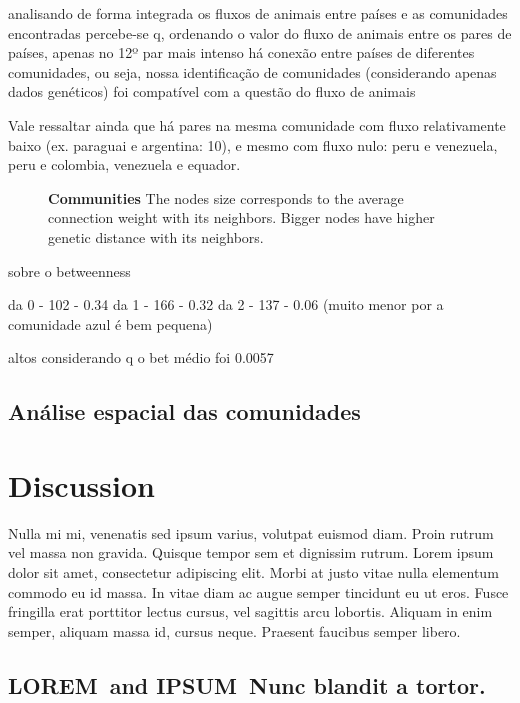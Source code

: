 \documentclass[10pt,letterpaper]{article}
\newcommand{\lorem}{{\bf LOREM}}
\newcommand{\ipsum}{{\bf IPSUM}}
\begin{document}
analisando de forma integrada os fluxos de animais entre países e as comunidades encontradas percebe-se q, ordenando o valor do fluxo de animais entre os pares de países, apenas no 12º par mais intenso há conexão entre países de diferentes comunidades, ou seja, nossa identificação de comunidades (considerando apenas dados genéticos) foi compatível com a questão do fluxo de animais

Vale ressaltar ainda que há pares na mesma comunidade com fluxo relativamente baixo (ex. paraguai e argentina: 10), e mesmo com fluxo nulo:
peru e venezuela, peru e colombia, venezuela e equador.




\begin{figure}[h]
\caption{{\bf Communities}
The nodes size corresponds to the average connection weight with its neighbors. Bigger nodes have higher genetic distance with its neighbors.}
\label{fig:communities}
\end{figure}



sobre o betweenness

da 0 - 102 - 0.34
da 1 - 166 - 0.32
da 2 - 137 - 0.06 (muito menor por a comunidade azul é bem pequena)

altos considerando q o bet médio foi 0.0057



\subsection*{Análise espacial das comunidades}

\section*{Discussion}
Nulla mi mi, venenatis sed ipsum varius, volutpat euismod diam. Proin rutrum vel massa non gravida. Quisque tempor sem et dignissim rutrum. Lorem ipsum dolor sit amet, consectetur adipiscing elit. Morbi at justo vitae nulla elementum commodo eu id massa. In vitae diam ac augue semper tincidunt eu ut eros. Fusce fringilla erat porttitor lectus cursus, vel sagittis arcu lobortis. Aliquam in enim semper, aliquam massa id, cursus neque. Praesent faucibus semper libero.

\subsection*{\lorem\ and \ipsum\ Nunc blandit a tortor.}
\end{document}
